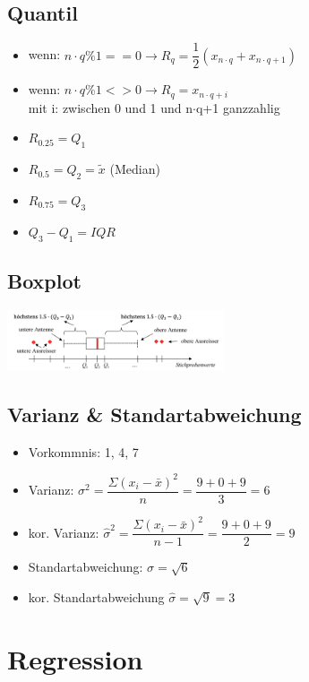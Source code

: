 \documentclass[8pt,a4paper]{scrartcl}
\begin{document}
\begin{multicols*}{3}
		\subsection{Quantil}   
			\begin{itemize}\itemsep0pt				
				\item wenn: $n\cdot q\%1 == 0 \rightarrow R_{q} = \dfrac{1}{2}(x_{n\cdot q}+x_{n\cdot q+1})$
				\item wenn: $n\cdot q\%1 <> 0 \rightarrow R_{q} = x_{n\cdot q+i}$ \\ mit i: zwischen 0 und 1 und n$\cdot$q+1 ganzzahlig
				\item $R_{0.25} = Q_{1}$
				\item $R_{0.5} = Q_{2} = \tilde{x}$ (Median)
				\item $R_{0.75} = Q_{3}$		
				\item $Q_{3} - Q_{1} = IQR$
			\end{itemize}
		\subsection{Boxplot}   
			\includegraphics[height=1.8cm]{img/Boxplot.png} \\
		\subsection{Varianz \& Standartabweichung}   
			\begin{itemize}\itemsep0pt				
				\item Vorkommnis: 1, 4, 7
				\item Varianz: $\sigma^{2} =  \dfrac{\Sigma(x_{i} -\bar{x})^{2}}{n} = \dfrac{9+0+9}{3} = 6$
				\item kor. Varianz: $\hat{\sigma}^{2} = \dfrac{\Sigma(x_{i} -\bar{x})^{2}}{n-1} = \dfrac{9+0+9}{2} = 9$
				\item Standartabweichung: $\sigma = \sqrt{6}$
				\item kor. Standartabweichung $\hat{\sigma} = \sqrt{9} = 3$
			\end{itemize}
		\section{Regression}

\end{multicols*}
\end{document}
